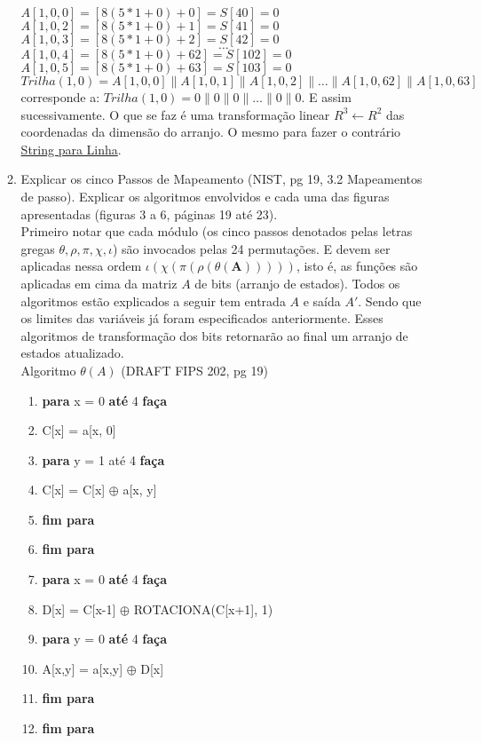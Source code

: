 \documentclass[12pt, a4paper]{article}
\begin{document}
\begin{enumerate}
\begin{enumerate}
$A[1, 0, 0] = [8(5*1+0)+0] = S[40] = 0$\\
$A[1, 0, 2] = [8(5*1+0)+1] = S[41] = 0$\\
$A[1, 0, 3] = [8(5*1+0)+2] = S[42] = 0$\\
$$\ldots$$
$A[1, 0, 4] = [8(5*1+0)+62] = S[102] = 0$\\
$A[1, 0, 5] = [8(5*1+0)+63] = S[103] = 0$\\

$Trilha (1, 0) = A[1, 0, 0] \parallel A[1, 0, 1] \parallel A[1, 0, 2] \parallel
\ldots \parallel A[1, 0, 62] \parallel A[1, 0, 63]$ corresponde a: $Trilha (1,
0) = 0 \parallel 0 \parallel 0 \parallel \ldots \parallel 0 \parallel 0$. E
assim sucessivamente. O que se faz é uma transformação linear $R^3 \leftarrow
R^2$ das coordenadas da dimensão do arranjo. O mesmo para fazer o contrário
\underline{String para Linha}.\\

\item Explicar os cinco Passos de Mapeamento (NIST, pg 19, 3.2 Mapeamentos de
passo). Explicar os algoritmos envolvidos e cada uma das figuras apresentadas
(figuras 3 a 6, páginas 19 até 23).\\

Primeiro notar que cada módulo (os cinco passos denotados pelas letras gregas
$\theta, \rho, \pi, \chi, \iota$) são invocados pelas 24 permutações. E devem
ser aplicadas nessa ordem $\iota(\chi(\pi(\rho(\theta(\textbf{A})))))$, isto é,
as funções são aplicadas em cima da matriz $A$ de bits (arranjo de estados).
Todos os algoritmos estão explicados a seguir tem entrada $A$ e saída $A'$.
Sendo que os limites das variáveis já foram especificados anteriormente. Esses
algoritmos de transformação dos bits retornarão ao final um arranjo de estados
atualizado.\\

Algoritmo $\theta(A)$ (DRAFT FIPS 202, pg 19)
  \begin{enumerate}
    \item[] \textbf{para} x = 0 \textbf{até} 4 \textbf{faça}
    \item[] \quad C[x] = a[x, 0]
    \item[] \quad \textbf{para} y = 1 até 4 \textbf{faça}
    \item[] \quad \quad C[x] = C[x] $\oplus$ a[x, y]
    \item[] \quad \textbf{fim para}
    \item[] \textbf{fim para}
    \item[] \textbf{para} x = 0 \textbf{até} 4 \textbf{faça}
    \item[] \quad D[x] = C[x-1] $\oplus$ ROTACIONA(C[x+1], 1)
    \item[] \quad \textbf{para} y = 0 \textbf{até} 4 \textbf{faça}
    \item[] \quad \quad A[x,y] = a[x,y] $\oplus$ D[x]
    \item[] \quad \textbf{fim para}
    \item[] \textbf{fim para}
  \end{enumerate}


\end{enumerate}
\end{enumerate}
\end{document}
